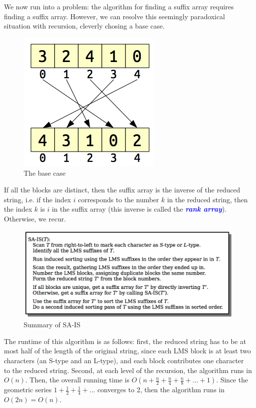 \documentclass[11pt, oneside]{article}
\newcommand{\emphasis}[1]{\textcolor{blue}{\textbf{\textit{#1}}}}
\begin{document}
We now run into a problem: the algorithm for finding a suffix array requires finding a suffix array.
However, we can resolve this seemingly paradoxical situation with recursion,
cleverly chosing a base case.

\newpage

\begin{figure}[h!]
\centering
\includegraphics[scale=0.4]{basecase}
\caption{The base case}
\end{figure}

If all the blocks are distinct, then the suffix array is the inverse of
the reduced string, i.e. if the index \( i \) corresponds to the number \( k \)
in the reduced string, then the index \( k \) is \( i \) in the suffix array (this inverse is called the \emphasis{rank array}).
Otherwise, we recur.

\begin{figure}[h!]
\centering
\includegraphics[scale=0.4]{summary}
\caption{Summary of SA-IS}
\end{figure}

The runtime of this algorithm is as follows:
first, the reduced string has to be at most half of the length of the original string,
since each LMS block is at least two characters (an S-type and an L-type), and each block
contributes one character to the reduced string.
Second, at each level of the recursion, the algorithm runs in \( O(n) \).
Then, the overall running time is \( O(n + \frac{n}{2} + \frac{n}{4} + \frac{n}{8} + \dots + 1) \).
Since the geometric series \( 1 + \frac{1}{2} + \frac{1}{4} + \dots \) converges to 2,
then the algorithm runs in \( O(2n) = O(n) \).
\end{document}
